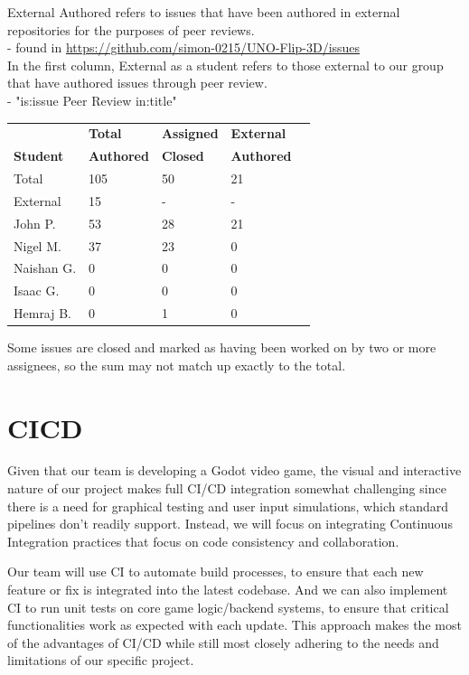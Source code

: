 \documentclass{article}
\begin{document}
\noindent
External Authored refers to issues that have been authored in external repositories for the purposes of peer reviews.\\
- found in \url{https://github.com/simon-0215/UNO-Flip-3D/issues}\\

\noindent
In the first column, External as a student refers to those external to our group that have authored issues through peer review.\\
- "is:issue Peer Review in:title"\\


\begin{table}[H]
\centering
\begin{tabular}{lllll}
\toprule
\textbf{ } & \textbf{Total} & \textbf{Assigned} & \textbf{External}\\
\textbf{Student} & \textbf{Authored} & \textbf{Closed} & \textbf{Authored}\\
\midrule
Total & 105 & 50 & 21 \\
\midrule
External & 15 & - & - \\
John P. & 53 & 28 & 21 \\
Nigel M. & 37 & 23 & 0 \\
Naishan G. & 0 & 0 & 0 \\
Isaac G. & 0 & 0 & 0 \\
Hemraj B. & 0 & 1 & 0 \\
\bottomrule
\end{tabular}
\end{table}

Some issues are closed and marked as having been worked on by two or more assignees, so the sum may not match up exactly to the total.


\newpage
\section{CICD}

Given that our team is developing a Godot video game, the visual and interactive nature of our project makes full CI/CD integration somewhat challenging since there is a need for graphical testing and user input simulations, which standard pipelines don’t readily support. Instead, we will focus on integrating Continuous Integration practices that focus on code consistency and collaboration.

Our team will use CI to automate build processes, to ensure that each new feature or fix is integrated into the latest codebase. And we can also implement CI to run unit tests on core game logic/backend systems, to ensure that critical functionalities work as expected with each update. This approach makes the most of the advantages of CI/CD while still most closely adhering to the needs and limitations of our specific project.
\end{document}
